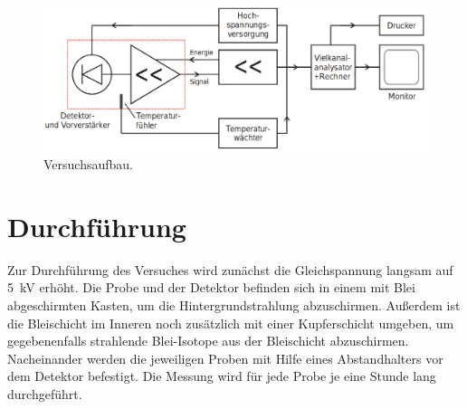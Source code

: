 \begin{figure}
  \centering
  \includegraphics[scale=0.4]{Aufbau.png}
  \caption{Versuchsaufbau. \cite{Q1}}
  \label{abb:2}
\end{figure}



\section{Durchführung}
Zur Durchführung des Versuches wird zunächst die Gleichspannung langsam auf \SI{5}{\kilo\volt}
erhöht.
Die Probe und der Detektor befinden sich in einem mit Blei abgeschirmten Kasten,
um die Hintergrundstrahlung abzuschirmen. Außerdem ist die Bleischicht im Inneren
noch zusätzlich mit einer Kupferschicht umgeben, um gegebenenfalls strahlende
Blei-Isotope aus der Bleischicht abzuschirmen.
Nacheinander werden die jeweiligen Proben mit Hilfe eines Abstandhalters
vor dem Detektor befestigt. Die Messung wird für jede Probe je eine Stunde lang
durchgeführt.
